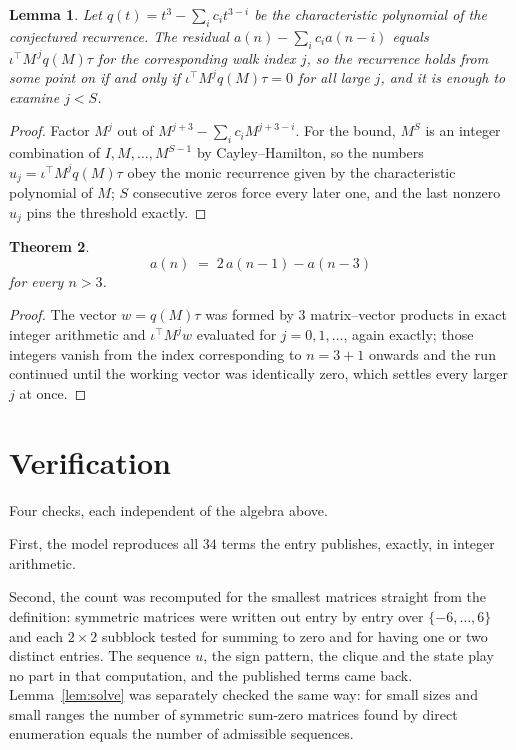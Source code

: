 \documentclass[11pt,a4paper]{article}
\theoremstyle{plain}
\newtheorem{theorem}{Theorem}
\newtheorem{lemma}[theorem]{Lemma}
\theoremstyle{definition}
\begin{document}
\begin{lemma}\label{lem:crit}
Let $q(t)=t^{3}-\sum_i c_it^{3-i}$ be the characteristic polynomial of the
conjectured recurrence. The residual $a(n)-\sum_ic_ia(n-i)$ equals
$\iota^{\!\top}M^{\,j}q(M)\tau$ for the corresponding walk index $j$, so the recurrence
holds from some point on if and only if $\iota^{\!\top}M^{j}q(M)\tau=0$ for all large $j$,
and it is enough to examine $j<S$.
\end{lemma}

\begin{proof}
Factor $M^{j}$ out of $M^{j+3}-\sum_ic_iM^{j+3-i}$. For the bound, $M^{S}$
is an integer combination of $I,M,\dots,M^{S-1}$ by Cayley--Hamilton, so the numbers
$u_j=\iota^{\!\top}M^{j}q(M)\tau$ obey the monic recurrence given by the characteristic
polynomial of $M$; $S$ consecutive zeros force every later one, and the last nonzero $u_j$
pins the threshold exactly.
\end{proof}

\begin{theorem}
\[
a(n)\;=\;2\,a(n-1) - a(n-3)
\]
for every $n>3$.
\end{theorem}

\begin{proof}
The vector $w=q(M)\tau$ was formed by $3$ matrix--vector products in exact integer
arithmetic and $\iota^{\!\top}M^{j}w$ evaluated for $j=0,1,\dots$, again exactly; those
integers vanish from the index corresponding to $n=3+1$ onwards and the run continued
until the working vector was identically zero, which settles every larger $j$ at once.
\end{proof}

\section{Verification}

Four checks, each independent of the algebra above.

First, the model reproduces all $34$ terms the entry publishes, exactly, in integer
arithmetic.

Second, the count was recomputed for the smallest matrices straight from the definition:
symmetric matrices were written out entry by entry over $\{-6,\dots,6\}$ and each
$2\times2$ subblock tested for summing to zero and for having one or two distinct entries. The
sequence $u$, the sign pattern, the clique and the state play no part in that computation, and
the published terms came back. Lemma~\ref{lem:solve} was separately checked the same way: for
small sizes and small ranges the number of symmetric sum-zero matrices found by direct
enumeration equals the number of admissible sequences.
\end{document}
